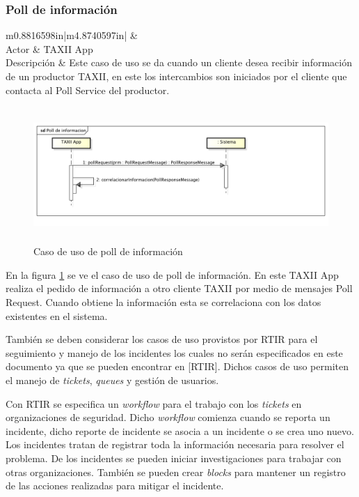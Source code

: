 \subsubsection{Poll de información}
\begin{flushleft}
	\tablefirsthead{}
	\tablehead{}
	\tabletail{}
	\tablelasttail{}
	\begin{supertabular}{m{0.8816598in}|m{4.8740597in}|}
		 &
		\\\hline
		{Actor} &
		{TAXII App}\\
		{Descripción} &
		{Este caso de uso se da cuando un cliente desea recibir información de un
			productor TAXII, en este los intercambios son iniciados por el cliente que contacta al Poll Service del
			productor.}\\\hhline{~-}
	\end{supertabular}
\end{flushleft}

\bigskip
\begin{figure}
	\centering  \includegraphics[width=5.7638in,height=2.0154in]{Analisis22-img/Analisis22-img030.png}
	\caption{Caso de uso de poll de
		información}
	\label{fig.pollinfo}
\end{figure}
	En la figura \ref{fig.pollinfo} se ve el caso de uso de poll de información. En este TAXII App realiza el pedido de información a otro
	cliente TAXII por medio de mensajes Poll Request. Cuando obtiene la información esta se correlaciona con los datos
	existentes en el sistema.


\bigskip


\bigskip

	También se deben considerar los casos de uso provistos por RTIR para el seguimiento y manejo de los incidentes los
	cuales no serán especificados en este documento ya que se pueden encontrar en \foreignlanguage{spanish}{[RTIR]}. Dichos
	casos de uso permiten el manejo de \textit{tickets}, \textit{queues }y gestión de usuarios.

	Con RTIR se especifica un \textit{workflow} para el trabajo con los \textit{tickets} en organizaciones de seguridad.
	Dicho \textit{workflow} comienza cuando se reporta un incidente, dicho reporte de incidente se asocia a un incidente o
	se crea uno nuevo. Los incidentes tratan de registrar toda la información necesaria para resolver el problema. De los
	incidentes se pueden iniciar investigaciones para trabajar con otras organizaciones. También se pueden crear
	\textit{blocks} para mantener un registro de las acciones realizadas para mitigar el incidente.

% 
%
